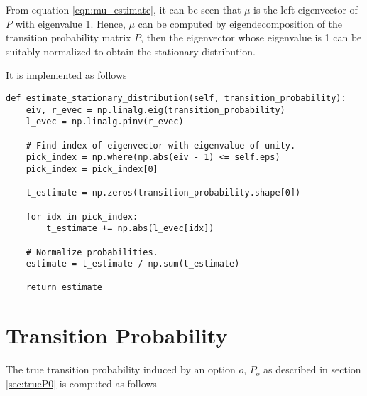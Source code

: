 From equation \ref{eqn:mu_estimate}, it can be seen that $\mu$ is the left eigenvector of $P$ with eigenvalue 1.
Hence, $\mu$ can be computed by eigendecomposition of the transition probability matrix $P$, then the eigenvector whose eigenvalue is 1 can be suitably normalized to obtain the stationary distribution.

It is implemented as follows

\begin{verbatim}
def estimate_stationary_distribution(self, transition_probability):
    eiv, r_evec = np.linalg.eig(transition_probability)
    l_evec = np.linalg.pinv(r_evec)

    # Find index of eigenvector with eigenvalue of unity.
    pick_index = np.where(np.abs(eiv - 1) <= self.eps)
    pick_index = pick_index[0]

    t_estimate = np.zeros(transition_probability.shape[0])

    for idx in pick_index:
        t_estimate += np.abs(l_evec[idx])

    # Normalize probabilities.
    estimate = t_estimate / np.sum(t_estimate)

    return estimate
\end{verbatim}


\section{Transition Probability}

The true transition probability induced by an option $o$, $P_o$ as described in section \ref{sec:trueP0} is computed as follows

